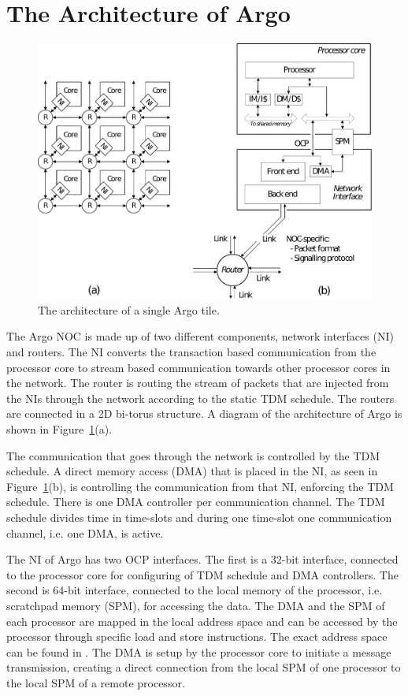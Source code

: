 \documentclass[a4paper,fontsize=10pt,twoside,DIV15,BCOR12mm,headinclude=true,footinclude=false,pagesize,bibtotoc]{scrbook}
\begin{document}
\section{The Architecture of Argo}
\label{sec:arch}


\begin{figure}
\centering
\includegraphics[scale=0.45]{fig/argo.pdf}
\caption{The architecture of a single Argo tile.}
\label{fig:diag}
\end{figure}

The Argo NOC is made up of two different components,
network interfaces (NI) and routers.
The NI converts the transaction based communication from the processor core to
stream based communication towards other processor cores in the network.
The router is routing the stream of packets that are injected from the NIs
through the network according to the static TDM schedule.
The routers are connected in a 2D bi-torus structure.
A diagram of the architecture of Argo is shown in Figure~\ref{fig:diag}(a).


The communication that goes through the network is controlled by the TDM schedule.
A direct memory access (DMA) that is placed in the NI, as seen in Figure~\ref{fig:diag}(b),
is controlling the communication from that NI, enforcing the TDM schedule.
There is one DMA controller per communication channel.
The TDM schedule divides time in time-slots and during one time-slot one 
communication channel, i.e. one DMA, is active.

The NI of Argo has two OCP \cite{ocp:spec} interfaces. The first is a 32-bit interface,
connected to the processor core for configuring of TDM schedule and DMA controllers.
The second is 64-bit interface, connected to the local memory of the processor, i.e. scratchpad memory (SPM),
for accessing the data. The DMA and the SPM of each processor are mapped in the local address space and
can be accessed by the processor through specific load and store instructions.
The exact address space can be found in \cite{patmos-handbook}.
The DMA is setup by the processor core to initiate a message transmission,
creating a direct connection from the local SPM of one processor to the local SPM of a remote processor. 
\end{document}
